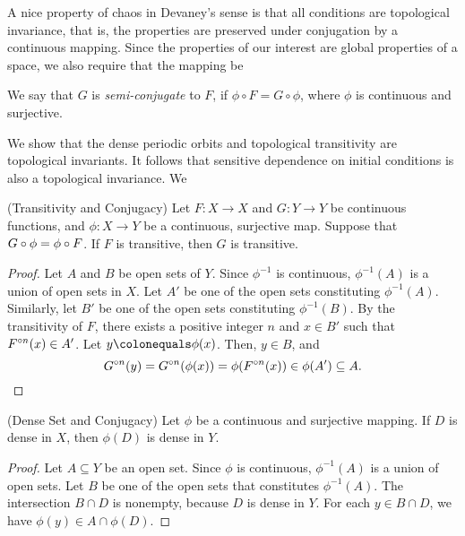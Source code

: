 \documentclass[12pt,draft,twoside]{book}
\begin{document}
A nice property of chaos in Devaney's sense is that all conditions are topological invariance, that is, the properties are preserved under conjugation by a continuous mapping.
Since the properties of our interest are global properties of a space, we also require that the mapping be 
\begin{definition}
    We say that $G$ is \textit{semi-conjugate} to $F$, if $\phi\circ F = G\circ\phi$, where $\phi$ is continuous and surjective.
\end{definition}
We show that the dense periodic orbits and topological transitivity are topological invariants.
It follows that sensitive dependence on initial conditions is also a topological invariance.
We 
  \begin{theorem}
    (Transitivity and Conjugacy) 
    Let $F: X \to X$ and $G: Y \to Y$ be continuous functions, and $\phi: X \to Y$ be a continuous, surjective map.
    Suppose that $G \circ \phi = \phi \circ F$.
    If $F$ is transitive, then $G$ is transitive.
    \label{thm:conj-trans}
    \begin{proof}
      Let $A$ and $B$ be open sets of $Y$.
      Since $\phi^{-1}$ is continuous, $\phi^{-1}(A)$ is a union of open sets in $X$.
      Let $A'$ be one of the open sets constituting $\phi^{-1}(A)$.
      Similarly, let $B'$ be one of the open sets constituting $\phi^{-1}(B)$.
      By the transitivity of $F$, there exists a positive integer $n$ and $x \in B'$ such that $F^{\circ n}(x)\in A'$.
      Let $y \ceq \phi(x)$.
      Then, $y \in B$, and 
      \begin{equation*}
        G^{\circ n}(y) 
        = G^{\circ n}(\phi(x))
        = \phi(F^{\circ n}(x)) \in \phi(A') \subseteq A.
      \end{equation*}
      \end{proof}
  \end{theorem}
  \begin{theorem}
    (Dense Set and Conjugacy) 
    Let $\phi$ be a continuous and surjective mapping.
    If $D$ is dense in $X$, then $\phi(D)$ is dense in $Y$.
    \label{thm:conj-dense}
    \begin{proof}
      Let $A \subseteq Y$ be an open set.
      Since $\phi$ is continuous, $\phi^{-1} (A)$ is a union of open sets.
      Let $B$ be one of the open sets that constitutes $\phi^{-1}(A)$.
      The intersection $B \cap D$ is nonempty, because $D$ is dense in $Y$.
      For each $y \in B \cap D$, we have $\phi(y) \in A \cap \phi(D)$.
    \end{proof}
  \end{theorem}
\end{document}
